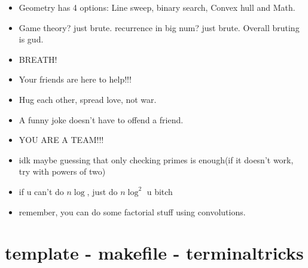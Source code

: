 \begin{itemize}
    \item Geometry has 4 options: Line sweep, binary search, Convex hull and Math.

    \item Game theory? just brute. recurrence in big num? just brute. Overall bruting is gud.
    
    \item BREATH!
    
    \item Your friends are here to help!!!
    
    \item Hug each other, spread love, not war.
    
    \item A funny joke doesn't have to offend a friend.
    
    \item YOU ARE A TEAM!!!

    \item idk maybe guessing that only checking primes is enough(if it doesn't work, try with powers of two)

    \item if u can't do $n \log$, just do $n\log^2$ u bitch
    
    \item remember, you can do some factorial stuff using convolutions.
    
    \end{itemize}
    



    \newpage
    \section{template - makefile - terminaltricks}
     

